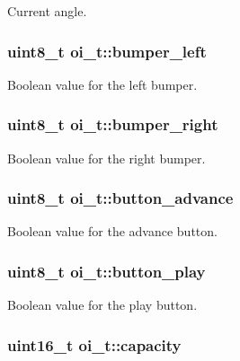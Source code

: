 Current angle. 

\hypertarget{structoi__t_a60914a17cbee5b368451499b5508375e}{
\subsubsection[{bumper\_\-left}]{\setlength{\rightskip}{0pt plus 5cm}uint8\_\-t {\bf oi\_\-t::bumper\_\-left}}}
\label{structoi__t_a60914a17cbee5b368451499b5508375e}


Boolean value for the left bumper. 

\hypertarget{structoi__t_ae796092f78ec2d01b15d4902153cbcdd}{
\subsubsection[{bumper\_\-right}]{\setlength{\rightskip}{0pt plus 5cm}uint8\_\-t {\bf oi\_\-t::bumper\_\-right}}}
\label{structoi__t_ae796092f78ec2d01b15d4902153cbcdd}


Boolean value for the right bumper. 

\hypertarget{structoi__t_a4636e65c1a0beac75914c1ac2da5826e}{
\subsubsection[{button\_\-advance}]{\setlength{\rightskip}{0pt plus 5cm}uint8\_\-t {\bf oi\_\-t::button\_\-advance}}}
\label{structoi__t_a4636e65c1a0beac75914c1ac2da5826e}


Boolean value for the advance button. 

\hypertarget{structoi__t_a2a0dc2eb8d0879a04cbeaf477fe091c3}{
\subsubsection[{button\_\-play}]{\setlength{\rightskip}{0pt plus 5cm}uint8\_\-t {\bf oi\_\-t::button\_\-play}}}
\label{structoi__t_a2a0dc2eb8d0879a04cbeaf477fe091c3}


Boolean value for the play button. 

\hypertarget{structoi__t_a84f2bdc6865e9aeffbb0752612f74074}{
\subsubsection[{capacity}]{\setlength{\rightskip}{0pt plus 5cm}uint16\_\-t {\bf oi\_\-t::capacity}}}
\label{structoi__t_a84f2bdc6865e9aeffbb0752612f74074}


